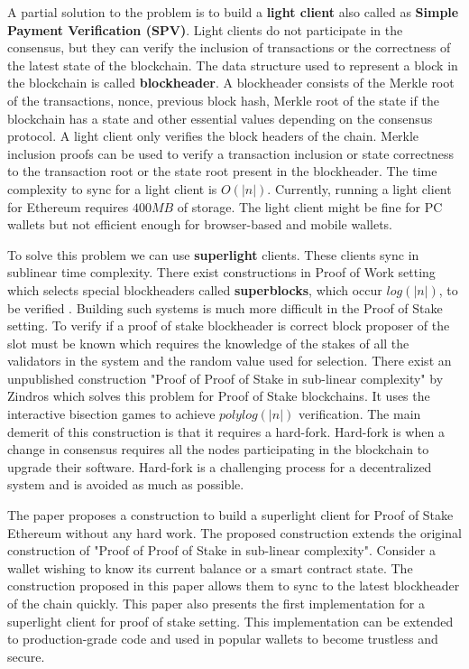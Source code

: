 \documentclass[a4paper,11pt,oneside]{article}
\theoremstyle{definition}
\begin{document}
  A partial solution to the problem is to build a \textbf{light client} also called as \textbf{Simple Payment Verification (SPV)}. Light clients do not participate in the consensus, but they can verify the inclusion of transactions or the correctness of the latest state of the blockchain. The data structure used to represent a block in the blockchain is called \textbf{blockheader}. A blockheader consists of the Merkle root of the transactions, nonce, previous block hash, Merkle root of the state if the blockchain has a state and other essential values depending on the consensus protocol. A light client only verifies the block headers of the chain. Merkle inclusion proofs can be used to verify a transaction inclusion or state correctness to the transaction root or the state root present in the blockheader. The time complexity to sync for a light client is $O(|n|)$. Currently, running a light client for Ethereum requires $400MB$ of storage\cite{LightClientRequirements}. The light client might be fine for PC wallets but not efficient enough for browser-based and mobile wallets.  
  
  To solve this problem we can use \textbf{superlight} clients. These clients sync in sublinear time complexity. There exist constructions in Proof of Work setting which selects special blockheaders called \textbf{superblocks}, which occur $log(|n|)$, to be verified \cite{NiPoPoW,PoPoW}. Building such systems is much more difficult in the Proof of Stake setting. To verify if a proof of stake blockheader is correct block proposer of the slot must be known which requires the knowledge of the stakes of all the validators in the system and the random value used for selection. There exist an unpublished construction "Proof of Proof of Stake in sub-linear complexity" by Zindros\cite{PoPoS} which solves this problem for Proof of Stake blockchains. It uses the interactive bisection games to achieve $polylog(|n|)$ verification. The main demerit of this construction is that it requires a hard-fork. Hard-fork is when a change in consensus requires all the nodes participating in the blockchain to upgrade their software. Hard-fork is a challenging process for a decentralized system and is avoided as much as possible.    
  
  The paper proposes a construction to build a superlight client for Proof of Stake Ethereum without any hard work. The proposed construction extends the original construction of "Proof of Proof of Stake in sub-linear complexity". Consider a wallet wishing to know its current balance or a smart contract state. The construction proposed in this paper allows them to sync to the latest blockheader of the chain quickly. This paper also presents the first implementation for a superlight client for proof of stake setting. This implementation can be extended to production-grade code and used in popular wallets to become trustless and secure.
  
\end{document}
